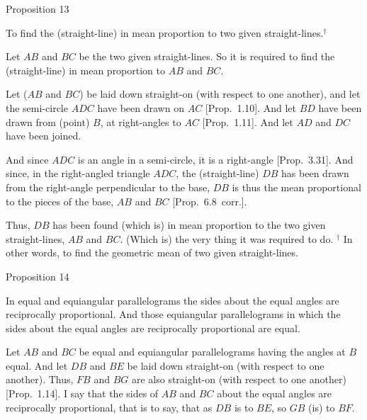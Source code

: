 
\begin{center}
{\large Proposition 13}
\end{center}

To find the (straight-line) in mean proportion to two
given straight-lines.$^\dag$

\epsfysize=1.5in
\centerline{}

Let $AB$ and $BC$ be the two given straight-lines. So it is required to
find the (straight-line) in mean proportion to $AB$ and $BC$.

Let  ($AB$ and $BC$) be laid down straight-on (with respect to one another), and
let the semi-circle $ADC$ have been drawn on $AC$  [Prop.~1.10]. And let $BD$ have been drawn
from (point) $B$, at right-angles to $AC$  [Prop.~1.11]. And let $AD$ and $DC$ have been joined.

And since $ADC$ is an angle in a semi-circle, it is a right-angle  [Prop.~3.31].
 And since, in the right-angled triangle $ADC$,  the (straight-line) $DB$ has been drawn from the right-angle perpendicular
  to the base, $DB$ is thus the mean proportional to the pieces of the base,  $AB$ and $BC$ 
[Prop.~6.8~corr.].

Thus, $DB$ has been found (which is) in mean proportion to the two given
straight-lines, $AB$ and $BC$. (Which is) the very thing it was required to
do.
{\footnotesize\noindent $^\dag$ In other words, to find the geometric mean of
two given straight-lines.}


\begin{center}
{\large Proposition 14}
\end{center}

In equal and equiangular parallelograms the
sides about the equal angles are reciprocally proportional. And those
equiangular parallelograms in which  the sides about the equal
angles are reciprocally proportional are equal.

Let $AB$ and $BC$ be equal and equiangular parallelograms having the angles
at $B$ equal. And let $DB$ and $BE$ be laid down straight-on (with respect to one
another). Thus, $FB$ and $BG$ are also straight-on (with respect to one another)  [Prop.~1.14].
I say that the sides of $AB$ and $BC$ about the equal angles
are reciprocally proportional, that is to say, that as $DB$ is to $BE$,
so $GB$ (is) to $BF$.

